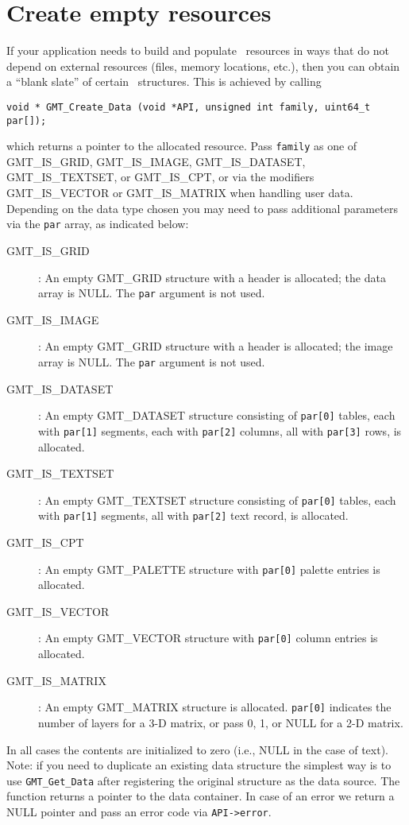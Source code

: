 \documentclass[11pt]{report}
\begin{document}
\section{Create empty resources}
\label{sec:create}

If your application needs to build and populate \GMT\ resources in ways that do
not depend on external resources (files, memory locations, etc.), then you
can obtain a ``blank slate'' of certain \GMT\ structures.  
This is achieved by calling

\begin{verbatim}
void * GMT_Create_Data (void *API, unsigned int family, uint64_t par[]);
\end{verbatim}
which returns a pointer to the allocated resource.
Pass \texttt{family} as one of GMT\_IS\_GRID, GMT\_IS\_IMAGE, GMT\_IS\_DATASET, GMT\_IS\_TEXTSET, or GMT\_IS\_CPT,
or via the modifiers GMT\_IS\_VECTOR or GMT\_IS\_MATRIX when handling user data.
Depending on the data type chosen you may need to pass additional parameters via
the \texttt{par} array, as indicated below:
\begin{description}
	\item [GMT\_IS\_GRID]: An empty GMT\_GRID structure with a header is
	allocated; the data array is NULL.  The \texttt{par} argument is not used.
	\item [GMT\_IS\_IMAGE]: An empty GMT\_GRID structure with a header is
	allocated; the image array is NULL.  The \texttt{par} argument is not used.
	\item [GMT\_IS\_DATASET]: An empty GMT\_DATASET structure consisting of
	\texttt{par[0]} tables, each with \texttt{par[1]} segments, each with
	\texttt{par[2]} columns, all with \texttt{par[3]} rows, is allocated.
	\item [GMT\_IS\_TEXTSET]: An empty GMT\_TEXTSET structure consisting of
	\texttt{par[0]} tables, each with \texttt{par[1]} segments,
	all with \texttt{par[2]} text record, is allocated.
	\item [GMT\_IS\_CPT]: An empty GMT\_PALETTE structure with \texttt{par[0]}
	palette entries is allocated.
	\item [GMT\_IS\_VECTOR]: An empty GMT\_VECTOR structure with \texttt{par[0]}
	column entries is allocated.
	\item [GMT\_IS\_MATRIX]: An empty GMT\_MATRIX structure is allocated.
	\texttt{par[0]} indicates the number of layers for a 3-D matrix, or pass 0, 1, or
	NULL for a 2-D matrix.
	
\end{description}
In all cases the contents are initialized to zero (i.e., NULL in the case of text).
Note: if you need to
duplicate an existing data structure the simplest way is to use \texttt{GMT\_Get\_Data}
after registering the original structure as the data source.
The function returns a pointer to the data container. In case of an error we return a
NULL pointer and pass an error code via \texttt{API->error}.
\end{document}
